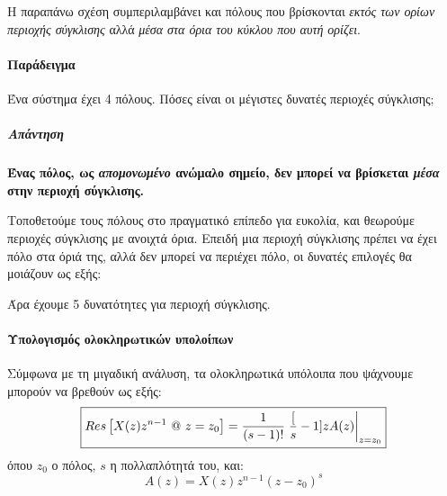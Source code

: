 \documentclass[11pt,a4paper,notitlepage,fleqn,draft]{article}
\begin{document}
Η παραπάνω σχέση συμπεριλαμβάνει και πόλους που βρίσκονται \emph{εκτός των ορίων περιοχής σύγκλισης} αλλά
\emph{μέσα στα όρια του κύκλου που αυτή ορίζει}.

\paragraph{Παράδειγμα}
Ένα σύστημα έχει 4 πόλους. Πόσες είναι οι μέγιστες δυνατές περιοχές σύγκλισης;
\subparagraph{Απάντηση}
\textbf{Ένας πόλος, ως \emph{απομονωμένο} ανώμαλο σημείο, δεν μπορεί να βρίσκεται \emph{μέσα} στην περιοχή σύγκλισης.}

Τοποθετούμε τους πόλους στο πραγματικό επίπεδο για ευκολία, και θεωρούμε περιοχές σύγκλισης με ανοιχτά
όρια. Επειδή μια περιοχή σύγκλισης πρέπει να έχει πόλο στα όριά της, αλλά δεν μπορεί να περιέχει πόλο,
οι δυνατές επιλογές θα μοιάζουν ως εξής:


Άρα έχουμε 5 δυνατότητες για περιοχή σύγκλισης.

\paragraph{Υπολογισμός ολοκληρωτικών υπολοίπων}
\label{sec:rescalc}
Σύμφωνα με τη μιγαδική ανάλυση, τα ολοκληρωτικά υπόλοιπα που ψάχνουμε μπορούν να βρεθούν ως εξής:
\[
\boxed{
\mathop{Res}\left[
X(z)z^{n-1} \ @\ z=z_0
\right] = \frac{1}{(s-1)!} \left.\frac{[}{s}-1]{}{z} A(z)\right|_{z=z_0}
}
\]
όπου \( z_0 \) ο πόλος, \( s \) η πολλαπλότητά του, και:
\[
A(z) = X(z)z^{n-1}(z-z_0)^s
\]
\end{document}
